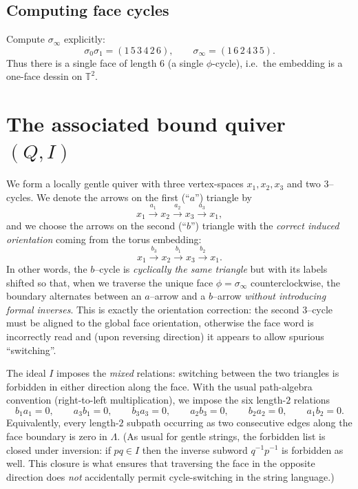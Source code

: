 \documentclass[11pt,oneside]{amsbook}
\numberwithin{equation}{section}
\theoremstyle{plain}
\theoremstyle{definition}
\theoremstyle{remark}
\begin{document}
\subsection{Computing face cycles}
Compute $\sigma_\infty$ explicitly:
\[
\sigma_0\sigma_1=(1\,5\,3\,4\,2\,6),
\qquad
\sigma_\infty=(1\,6\,2\,4\,3\,5).
\]
Thus there is a single face of length $6$ (a single $\phi$-cycle), i.e.\ the embedding is a one-face dessin on $\mathbb T^2$.

\section{The associated bound quiver $(Q,I)$}
We form a locally gentle quiver with three vertex-spaces $x_1,x_2,x_3$ and two $3$--cycles.
We denote the arrows on the first (``$a$'') triangle by
\[
x_1\xrightarrow{a_1}x_2\xrightarrow{a_2}x_3\xrightarrow{a_3}x_1,
\]
and we choose the arrows on the second (``$b$'') triangle with the \emph{correct induced orientation} coming from the torus embedding:
\[
x_1\xrightarrow{b_3}x_2\xrightarrow{b_1}x_3\xrightarrow{b_2}x_1.
\]
In other words, the $b$--cycle is \emph{cyclically the same triangle} but with its labels shifted so that, when we traverse the unique face $\phi=\sigma_\infty$ counterclockwise,
the boundary alternates between an $a$--arrow and a $b$--arrow \emph{without introducing formal inverses}.
This is exactly the orientation correction: the second $3$--cycle must be aligned to the global face orientation, otherwise the face word is incorrectly read and (upon reversing direction) it appears to allow spurious ``switching''.

The ideal $I$ imposes the \emph{mixed} relations: switching between the two triangles is forbidden in either direction along the face.
With the usual path-algebra convention (right-to-left multiplication), we impose the six length-$2$ relations
\[
b_1a_1=0,\qquad a_3b_1=0,\qquad b_3a_3=0,\qquad a_2b_3=0,\qquad b_2a_2=0,\qquad a_1b_2=0.
\]
Equivalently, every length-$2$ subpath occurring as two consecutive edges along the face boundary is zero in $\Lambda$.
(As usual for gentle strings, the forbidden list is closed under inversion: if $pq\in I$ then the inverse subword $q^{-1}p^{-1}$ is forbidden as well.
This closure is what ensures that traversing the face in the opposite direction does \emph{not} accidentally permit cycle-switching in the string language.)
\end{document}
